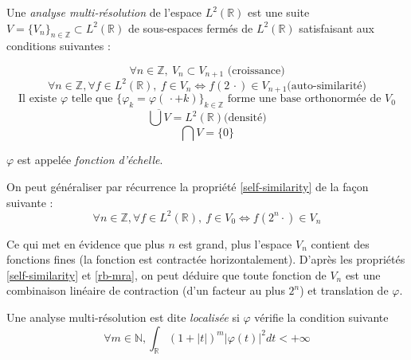 	\begin{mydef}
		Une \textit{analyse multi-résolution} de l'espace $L^2(\mathbb{R})$ est une suite $V = \{V_n\}_{n \in \mathbb{Z}} \subset L^2(\mathbb{R})$ de sous-espaces fermés de $L^2(\mathbb{R})$ satisfaisant aux conditions suivantes :

		\begin{equation}
			\label{growth}
			\forall n \in \mathbb{Z}, ~ V_{n} \subset V_{n+1} \text{ (croissance)}
		\end{equation}
		\begin{equation}
			\label{self-similarity}
			\forall n \in \mathbb{Z}, \forall f \in L^2(\mathbb{R}), ~ f \in V_n \Longleftrightarrow f (2 \, \cdot ) \in V_{n+1} \text{(auto-similarité)}
		\end{equation}
		\begin{equation}
			\label{rb-mra}
			\text{Il existe $\varphi$ telle que $\{\varphi_k = \varphi(\, \cdot + k)\}_{k \in \mathbb{Z}}$ forme une base orthonormée de $V_0$}
		\end{equation}
		\begin{equation}
			\label{density}
			\overline{\bigcup V} = L^2(\mathbb{R}) \text{(densité)}
		\end{equation}
		\begin{equation}
			\label{inter}
			\bigcap V = \{0\}
		\end{equation}
		
		$\varphi$ est appelée \textit{fonction d'échelle}.
	\end{mydef}
	
	On peut généraliser par récurrence la propriété \ref{self-similarity} de la façon suivante :
	\begin{equation}
		\forall n \in \mathbb{Z}, \forall f \in L^2(\mathbb{R}), ~ f \in V_0 \Longleftrightarrow f \left(2^n \cdot\right) \in V_{n}
	\end{equation}

	Ce qui met en évidence que plus $n$ est grand, plus l'espace $V_n$ contient des fonctions fines (la fonction est contractée horizontalement). D'après les propriétés \ref{self-similarity} et \ref{rb-mra}, on peut déduire que toute fonction de $V_n$ est une combinaison linéaire de contraction (d'un facteur au plus $2^n$) et translation de $\varphi$.

	\begin{mydef}
		Une analyse multi-résolution est dite \textit{localisée} si $\varphi$ vérifie la condition suivante
		\begin{equation}
			\label{localized}
			\forall m \in \mathbb{N}, \int_\mathbb{R} (1+|t|)^m |\varphi(t)|^2 dt < + \infty
		\end{equation}
	\end{mydef}
	
